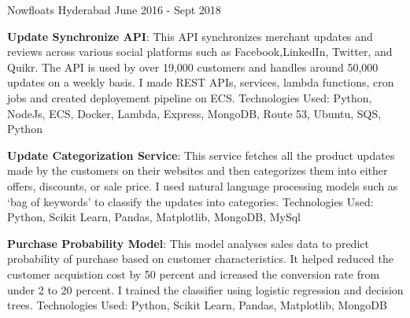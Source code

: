 \begin{cventries}
    {Nowfloats} %
    {Hyderabad} %
    {June 2016 - Sept 2018} %
    {
      \begin{cvitems} %
        \item {\textbf{Update Synchronize API}: This API synchronizes merchant updates and reviews across 
        various social platforms such as Facebook,LinkedIn, Twitter, and Quikr. The API is used 
        by over 19,000 customers and handles around 50,000 updates on a weekly basis. 
        I made REST APIs, services, lambda functions, cron jobs and created deployement pipeline on 
        ECS. 
        Technologies Used: Python, NodeJs, ECS, Docker, Lambda, Express, MongoDB, Route 53, Ubuntu, SQS, Python}
        \item {\textbf{Update Categorization Service}: This service fetches all the product updates made by the 
        customers on their websites and then categorizes them into either offers, discounts, or sale price. 
        I used natural language processing models such as ‘bag of keywords’ to classify the updates 
        into categories. Technologies Used: Python, Scikit Learn, Pandas, Matplotlib, MongoDB, MySql }
        \item {\textbf{Purchase Probability Model}: This model analyses sales data to predict probability 
        of purchase based on customer characteristics. It helped reduced the customer acquistion cost by 
        50 percent and icreased the conversion rate from under 2 to 20 percent. I trained the classifier using 
        logistic regression and decision trees. 
        Technologies Used: Python, Scikit Learn, Pandas, Matplotlib, MongoDB}
      \end{cvitems}
    }

\end{cventries}